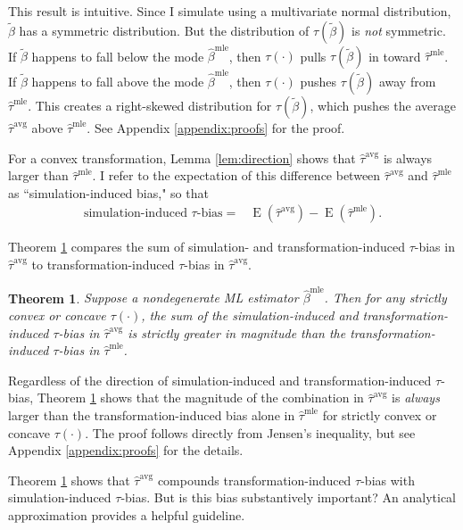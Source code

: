 \documentclass[12pt]{article}
\newtheorem{theorem}{Theorem}
\DeclareMathOperator*{\E}{\text{E}}
\begin{document}
\noindent This result is intuitive. Since I simulate using a multivariate normal distribution, $\tilde{\beta}$ has a symmetric distribution. But the distribution of $\tau(\tilde{\beta})$ is \emph{not} symmetric. If $\tilde{\beta}$ happens to fall below the mode $\hat{\beta}^\text{mle}$, then $\tau(\cdot)$ pulls $\tau(\tilde{\beta})$ in toward $\hat{\tau}^\text{mle}$.
If $\tilde{\beta}$ happens to fall above the mode $\hat{\beta}^\text{mle}$, then $\tau(\cdot)$ pushes $\tau(\tilde{\beta})$ away from $\hat{\tau}^\text{mle}$. This creates a right-skewed distribution for $\tau(\tilde{\beta})$, which pushes the average $\hat{\tau}^\text{avg}$ above $\hat{\tau}^\text{mle}$. See Appendix \ref{appendix:proofs} for the proof.

For a convex transformation, Lemma \ref{lem:direction} shows that $\hat{\tau}^\text{avg}$ is always larger than $\hat{\tau}^\text{mle}$. I refer to the expectation of this difference between $\hat{\tau}^\text{avg}$ and $\hat{\tau}^\text{mle}$ as ``simulation-induced bias," so that
\begin{align*}
\text{simulation-induced } \tau\text{-bias} =& \E \left(\hat{\tau}^\text{avg} \right) - \E \left(\hat{\tau}^\text{mle} \right).
\end{align*}

Theorem \ref{thm:direction} compares the sum of simulation- and transformation-induced $\tau$-bias in $\hat{\tau}^\text{avg}$ to transformation-induced $\tau$-bias in $\hat{\tau}^\text{avg}$.

\begin{theorem}\label{thm:direction}
Suppose a nondegenerate ML estimator $\hat{\beta}^\text{mle}$.
Then for any strictly convex or concave $\tau(\cdot)$, the sum of the simulation-induced and transformation-induced $\tau$-bias in $\hat{\tau}^{\text{avg}}$ is strictly greater in magnitude than the transformation-induced $\tau$-bias in $\hat{\tau}^{\text{mle}}$.
\end{theorem}

\noindent Regardless of the direction of simulation-induced and transformation-induced $\tau$-bias, Theorem \ref{thm:direction} shows that the magnitude of the combination in $\hat{\tau}^{\text{avg}}$ is \textit{always} larger than the transformation-induced bias alone in  $\hat{\tau}^{\text{mle}}$ for strictly convex or concave $\tau(\cdot)$. The proof follows directly from Jensen's inequality, but see Appendix \ref{appendix:proofs} for the details.

Theorem \ref{thm:direction} shows that $\hat{\tau}^\text{avg}$ compounds transformation-induced $\tau$-bias with simulation-induced $\tau$-bias. But is this bias substantively important? An analytical approximation provides a helpful guideline.
\end{document}
